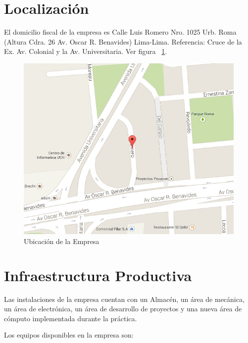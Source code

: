 \section{Localización}

El domicilio fiscal de la empresa es Calle Luis Romero Nro. 1025 Urb. Roma (Altura Cdra. 26 Av. Oscar R. Benavides) Lima-Lima. Referencia: Cruce de la Ex. Av. Colonial y la Av. Universitaria. Ver figura ~\ref{fig:location}.

\begin{figure}[h!]
  \centering
  \includegraphics[scale=0.5]{images/location.png}
  \caption{Ubicación de la Empresa}
  \label{fig:location}
\end{figure}


\section{Infraestructura Productiva}

Las instalaciones de la empresa cuentan con un Almacén, un área de mecánica, un área de electrónica, un área de desarrollo de proyectos y una nueva área de cómputo implementada durante la práctica.

Los equipos disponibles en la empresa son:

